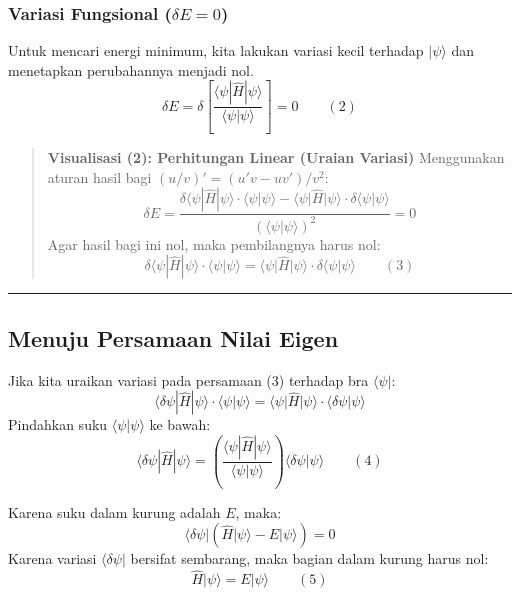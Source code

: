 \hypertarget{b.-variasi-fungsional-delta-e-0}{%
\subsubsection{\texorpdfstring{Variasi Fungsional (\(\delta E = 0\))}{Variasi Fungsional (\textbackslash delta E = 0)}}\label{b.-variasi-fungsional-delta-e-0}}

Untuk mencari energi minimum, kita lakukan variasi kecil terhadap \(|\psi\rangle\) dan menetapkan perubahannya menjadi nol. \[ \delta E = \delta \left[ \frac{\langle \psi | \hat{H} | \psi \rangle}{\langle \psi | \psi \rangle} \right] = 0 \qquad (2) \]

\begin{quote}
\textbf{Visualisasi (2): Perhitungan Linear (Uraian Variasi)} Menggunakan aturan hasil bagi \((u/v)' = (u'v - uv')/v^2\): \[ \delta E = \frac{\delta \langle \psi | \hat{H} | \psi \rangle \cdot \langle \psi | \psi \rangle - \langle \psi | \hat{H} | \psi \rangle \cdot \delta \langle \psi | \psi \rangle}{(\langle \psi | \psi \rangle)^2} = 0 \] Agar hasil bagi ini nol, maka pembilangnya harus nol: \[ \delta \langle \psi | \hat{H} | \psi \rangle \cdot \langle \psi | \psi \rangle = \langle \psi | \hat{H} | \psi \rangle \cdot \delta \langle \psi | \psi \rangle \qquad (3) \]
\end{quote}

\begin{center}\rule{0.5\linewidth}{0.5pt}\end{center}

\hypertarget{jembatan-logika-menuju-persamaan-nilai-eigen}{%
\subsection{Menuju Persamaan Nilai Eigen}\label{jembatan-logika-menuju-persamaan-nilai-eigen}}

Jika kita uraikan variasi pada persamaan (3) terhadap bra \(\langle \psi |\): \[ \langle \delta \psi | \hat{H} | \psi \rangle \cdot \langle \psi | \psi \rangle = \langle \psi | \hat{H} | \psi \rangle \cdot \langle \delta \psi | \psi \rangle \] Pindahkan suku \(\langle \psi | \psi \rangle\) ke bawah: \[ \langle \delta \psi | \hat{H} | \psi \rangle = \left( \frac{\langle \psi | \hat{H} | \psi \rangle}{\langle \psi | \psi \rangle} \right) \langle \delta \psi | \psi \rangle \qquad (4) \]

Karena suku dalam kurung adalah \(E\), maka: \[ \langle \delta \psi | ( \hat{H} | \psi \rangle - E | \psi \rangle ) = 0 \] Karena variasi \(\langle \delta \psi |\) bersifat sembarang, maka bagian dalam kurung harus nol: \[ \hat{H} | \psi \rangle = E | \psi \rangle \qquad (5) \]

